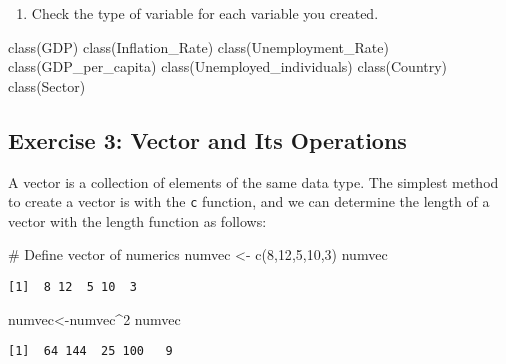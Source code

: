 \documentclass[
  letterpaper,
  DIV=11,
  numbers=noendperiod]{scrartcl}
\newenvironment{Shaded}{\begin{snugshade}}{\end{snugshade}}
\newcommand{\CommentTok}[1]{\textcolor[rgb]{0.37,0.37,0.37}{#1}}
\newcommand{\DecValTok}[1]{\textcolor[rgb]{0.68,0.00,0.00}{#1}}
\newcommand{\FunctionTok}[1]{\textcolor[rgb]{0.28,0.35,0.67}{#1}}
\newcommand{\NormalTok}[1]{\textcolor[rgb]{0.00,0.23,0.31}{#1}}
\newcommand{\OtherTok}[1]{\textcolor[rgb]{0.00,0.23,0.31}{#1}}
\newcommand{\SpecialCharTok}[1]{\textcolor[rgb]{0.37,0.37,0.37}{#1}}
\providecommand{\tightlist}{%
  \setlength{\itemsep}{0pt}\setlength{\parskip}{0pt}}\usepackage{longtable,booktabs,array}
\begin{document}
\begin{enumerate}
\def\labelenumi{\arabic{enumi}.}
\setcounter{enumi}{3}
\tightlist
\item
  Check the type of variable for each variable you created.
\end{enumerate}

\begin{Shaded}
\begin{Highlighting}[]
\FunctionTok{class}\NormalTok{(GDP)}
\FunctionTok{class}\NormalTok{(Inflation\_Rate)}
\FunctionTok{class}\NormalTok{(Unemployment\_Rate)}
\FunctionTok{class}\NormalTok{(GDP\_per\_capita)}
\FunctionTok{class}\NormalTok{(Unemployed\_individuals)}
\FunctionTok{class}\NormalTok{(Country)}
\FunctionTok{class}\NormalTok{(Sector)}
\end{Highlighting}
\end{Shaded}

\subsection{Exercise 3: Vector and Its
Operations}\label{exercise-3-vector-and-its-operations}

A vector is a collection of elements of the same data type. The simplest
method to create a vector is with the \texttt{c} function, and we can
determine the length of a vector with the length function as follows:

\begin{Shaded}
\begin{Highlighting}[]
\CommentTok{\# Define vector of numerics}
\NormalTok{numvec }\OtherTok{\textless{}{-}} \FunctionTok{c}\NormalTok{(}\DecValTok{8}\NormalTok{,}\DecValTok{12}\NormalTok{,}\DecValTok{5}\NormalTok{,}\DecValTok{10}\NormalTok{,}\DecValTok{3}\NormalTok{)}
\NormalTok{numvec}
\end{Highlighting}
\end{Shaded}

\begin{verbatim}
[1]  8 12  5 10  3
\end{verbatim}

\begin{Shaded}
\begin{Highlighting}[]
\NormalTok{numvec}\OtherTok{\textless{}{-}}\NormalTok{numvec}\SpecialCharTok{\^{}}\DecValTok{2}
\NormalTok{numvec}
\end{Highlighting}
\end{Shaded}

\begin{verbatim}
[1]  64 144  25 100   9
\end{verbatim}
\end{document}
